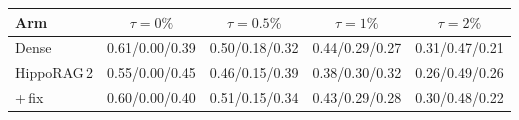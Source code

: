 \begin{tabular}{l cccc}
\toprule
Arm & $\tau=0\%$ & $\tau=0.5\%$ & $\tau=1\%$ & $\tau=2\%$ \\
\midrule
Dense & 0.61/0.00/0.39 & 0.50/0.18/0.32 & 0.44/0.29/0.27 & 0.31/0.47/0.21 \\
HippoRAG\,2 & 0.55/0.00/0.45 & 0.46/0.15/0.39 & 0.38/0.30/0.32 & 0.26/0.49/0.26 \\
+\,fix & 0.60/0.00/0.40 & 0.51/0.15/0.34 & 0.43/0.29/0.28 & 0.30/0.48/0.22 \\
\bottomrule
\end{tabular}
